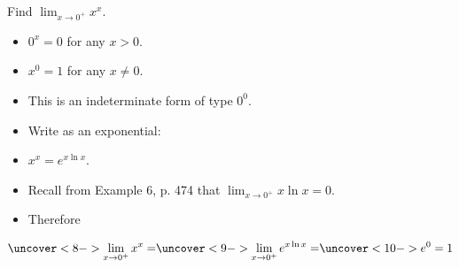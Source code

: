 \begin{frame}
\begin{example}
Find $\lim_{x\rightarrow 0^+} x^x$.
\begin{itemize}
\item<2->  $0^x = 0$ for any $x > 0$.
\item<3->  $x^0 = 1$ for any $x \neq 0$.
\item<4->  This is an indeterminate form of type $0^0$.
\item<5->  Write as an exponential:
\item<6->  $x^x = e^{x\ln x}$.
\item<7->  Recall from Example 6, p. 474 that $\lim_{x\rightarrow 0^+} x\ln x = 0$.
\item<8->  Therefore
\end{itemize}
\[
\uncover<8->{ \lim_{x\rightarrow 0^+} x^x = }%
\uncover<9->{ \lim_{x\rightarrow 0^+} e^{x\ln x} = }%
\uncover<10->{  e^{0} = 1}%
\]
\end{example}
\end{frame}
